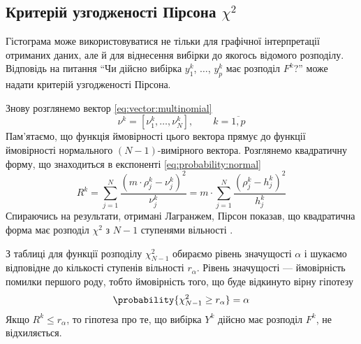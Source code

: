 \subsection{Критерій узгодженості Пірсона $\chi^2$}
Гістограма може використовуватися не тільки для графічної інтерпретації
отриманих даних, але й для віднесення вибірки до якогось відомого розподілу.
Відповідь на питання ``Чи дійсно вибірка $y_1^k$, $\dots$, $y_p^k$ має розподіл
$F^k$?'' може надати критерій узгодженості Пірсона. %

Знову розглянемо вектор \eqref{eq:vector:multinomial}
\begin{equation*}
  \nu^k = \left[ \nu_1^k, \dots, \nu_N^k \right],
  \qquad k = \overline{1,p}
\end{equation*}
Пам’ятаємо, що функція ймовірності цього вектора прямує до функції ймовірності
нормального $\left( N - 1 \right)$-вимірного вектора.
Розглянемо квадратичну форму, що знаходиться в експоненті
\eqref{eq:probability:normal}
\begin{equation}\label{eq:pearson:Rk}
  R^k
  = \sum_{j=1}^{N}\frac{\left( m \cdot \rho_j^k - \nu_j^k \right)^2}{\nu_j^k}
  = m \cdot \sum_{j=1}^{N}\frac{\left( \rho_j^k - h_j^k \right)^2}{h_j^k}
\end{equation}
Спираючись на результати, отримані Лагранжем, Пірсон показав, що квадратична
форма має розподіл $\chi^2$ з $N-1$ ступенями вільності
\cite{Pearson:1900} \cite{Hald:2010}.

З таблиці для функції розподілу $\chi_{N-1}^2$ обираємо рівень значущості
$\alpha$ і шукаємо відповідне до кількості ступенів вільності $r_{\alpha}$.
Рівень значущості --- ймовірність помилки першого роду, тобто ймовірність того,
що буде відкинуто вірну гіпотезу
\begin{equation*}
  \probability{\chi_{N-1}^2 \ge r_{\alpha}} = \alpha
\end{equation*}
Якщо $R^k \le r_{\alpha}$, то гіпотеза про те, що вибірка $Y^k$ дійсно має
розподіл $F^k$, не відхиляється.

